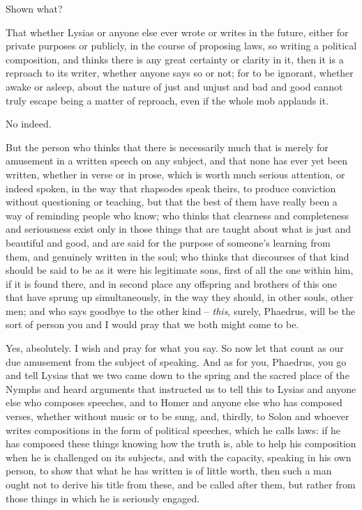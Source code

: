  Shown what?

That whether Lysias or anyone else ever wrote or writes in the
future, either for private purposes or publicly, in the course of
proposing laws, so writing a political composition, and thinks there is
any great certainty or clarity in it, then it is  a reproach to
its writer, whether anyone says so or not; for to  be ignorant,
whether awake or asleep, about the nature of just and unjust and bad and
good cannot truly escape being a matter of reproach, even if the whole
mob applauds it.

No indeed.

 But the person who thinks that there is necessarily
much that is merely for amusement in a written speech on any subject,
and that none has ever yet been written, whether in verse or in prose,
which is worth much serious attention, or indeed spoken, in the way that
rhapsodes speak theirs,
to produce conviction without questioning or teaching, but that
 the best of them have really been a way of reminding people
who know; who thinks that clearness and completeness and seriousness
exist only in those things that are taught about what is just and
beautiful and good, and are said for the purpose of  someone's
learning from them, and genuinely written in the soul; who thinks that
discourses of that kind
should be said to be as it were his legitimate sons, first of all the
one within  him, if it is found there, and in second place any
offspring and brothers of this one that have sprung up simultaneously,
in the way they should, in other souls, other men; and who says goodbye
to the other kind -- {\em this}, surely, Phaedrus, will be the sort of
person you and I would pray that we both might come to be.

 Yes, absolutely. I wish and pray for what you say.
So now let that count as our due amusement from the subject of
speaking. And as for you, Phaedrus, you go and tell Lysias that we two
came down to the spring and the sacred  place of the Nymphs and
heard arguments that
instructed us to tell this to Lysias and anyone else who composes
speeches, and to Homer and anyone else who has composed verses, whether
without music or to be sung, and, thirdly, to Solon and whoever writes
compositions in the form of political speeches,  which he calls
laws: if he has composed these things knowing how the truth is, able to
help his composition when he is challenged on its subjects, and with the
capacity, speaking in his own person, to show that what he has written
is of little worth, then
such a man ought not to derive his title from these, and be called after
them, but rather from those things in  which he is seriously
engaged.

